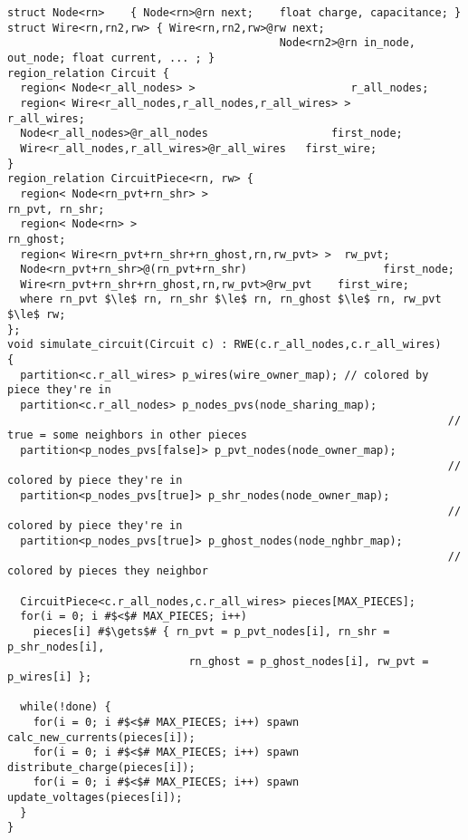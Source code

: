 \begin{lstlisting}[float={t},label={lst:code_ex},caption={Circuit Simulation Code Example}]
struct Node<rn>    { Node<rn>@rn next;    float charge, capacitance; }
struct Wire<rn,rn2,rw> { Wire<rn,rn2,rw>@rw next;
                                          Node<rn2>@rn in_node, out_node; float current, ... ; }
region_relation Circuit {
  region< Node<r_all_nodes> >                        r_all_nodes;
  region< Wire<r_all_nodes,r_all_nodes,r_all_wires> >       r_all_wires;
  Node<r_all_nodes>@r_all_nodes                   first_node;
  Wire<r_all_nodes,r_all_wires>@r_all_wires   first_wire;
}
region_relation CircuitPiece<rn, rw> {
  region< Node<rn_pvt+rn_shr> >                                 rn_pvt, rn_shr;
  region< Node<rn> >                                                   rn_ghost;
  region< Wire<rn_pvt+rn_shr+rn_ghost,rn,rw_pvt> >  rw_pvt;
  Node<rn_pvt+rn_shr>@(rn_pvt+rn_shr)                     first_node;
  Wire<rn_pvt+rn_shr+rn_ghost,rn,rw_pvt>@rw_pvt    first_wire;
  where rn_pvt $\le$ rn, rn_shr $\le$ rn, rn_ghost $\le$ rn, rw_pvt $\le$ rw;
};
void simulate_circuit(Circuit c) : RWE(c.r_all_nodes,c.r_all_wires)
{
  partition<c.r_all_wires> p_wires(wire_owner_map); // colored by piece they're in
  partition<c.r_all_nodes> p_nodes_pvs(node_sharing_map);
                                                                    // true = some neighbors in other pieces
  partition<p_nodes_pvs[false]> p_pvt_nodes(node_owner_map);
                                                                    // colored by piece they're in
  partition<p_nodes_pvs[true]> p_shr_nodes(node_owner_map);
                                                                    // colored by piece they're in
  partition<p_nodes_pvs[true]> p_ghost_nodes(node_nghbr_map);
                                                                    // colored by pieces they neighbor

  CircuitPiece<c.r_all_nodes,c.r_all_wires> pieces[MAX_PIECES];
  for(i = 0; i #$<$# MAX_PIECES; i++) 
    pieces[i] #$\gets$# { rn_pvt = p_pvt_nodes[i], rn_shr = p_shr_nodes[i],
                            rn_ghost = p_ghost_nodes[i], rw_pvt = p_wires[i] };

  while(!done) {
    for(i = 0; i #$<$# MAX_PIECES; i++) spawn calc_new_currents(pieces[i]);
    for(i = 0; i #$<$# MAX_PIECES; i++) spawn distribute_charge(pieces[i]);
    for(i = 0; i #$<$# MAX_PIECES; i++) spawn update_voltages(pieces[i]);
  }
}


\end{lstlisting}
